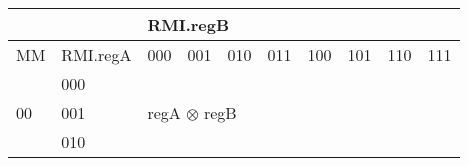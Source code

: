 \documentclass{article}
\begin{document}
\begin{adjustbox}{width=1\textwidth}
\begin{tabular}{|ll|llllllll|}
\hline
\multicolumn{2}{|l|}{}                               & \multicolumn{8}{l|}{RMI.regB}                                                                                                                                                                                                                                                                                                                                                                                                                                                                  \\ \hline
\multicolumn{1}{|l|}{MM}                  & RMI.regA & \multicolumn{1}{l|}{000}                             & \multicolumn{1}{l|}{001}                             & \multicolumn{1}{l|}{010}                                & \multicolumn{1}{l|}{011}                                & \multicolumn{1}{l|}{100}                                           & \multicolumn{1}{l|}{101}                                           & \multicolumn{1}{l|}{110}                                           & 111                                           \\ \hline
\multicolumn{1}{|l|}{\multirow{8}{*}{00}} & 000      & \multicolumn{8}{l|}{\multirow{8}{*}{regA $\otimes$ regB}}                                                                                                                                                                                                                                                                                                                                                                                                                                      \\ \cline{2-2}
\multicolumn{1}{|l|}{}                    & 001      & \multicolumn{8}{l|}{}                                                                                                                                                                                                                                                                                                                                                                                                                                                                          \\ \cline{2-2}
\multicolumn{1}{|l|}{}                    & 010      & \multicolumn{8}{l|}{}                                                                                                                                                                                                                                                                                                                                                                                                                                                                          \\ \cline{2-2}

\end{tabular}
\end{adjustbox}
\end{document}
